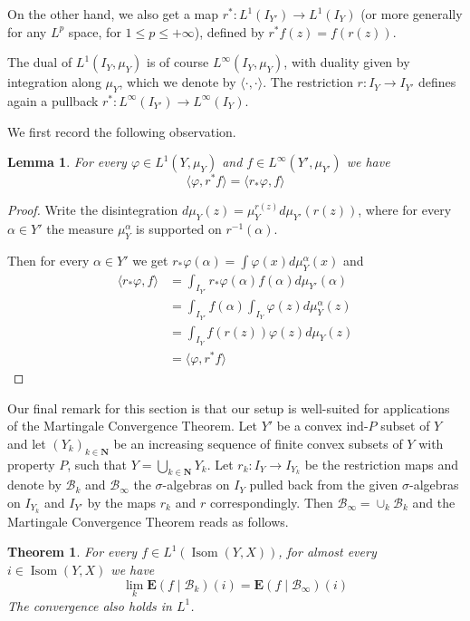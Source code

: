 \documentclass[a4paper, 11pt]{article}
\theoremstyle{plain}
\newtheorem{theorem}[proposition]{Theorem}
\newtheorem{lemma}[proposition]{Lemma}
\theoremstyle{definition}
\theoremstyle{remark}
\DeclareMathOperator{\Isom}{Isom}
\newcommand{\NN}{\mathbf{N}}                          %
\newcommand{\calB}{\mathcal{B}}
\newcommand{\EE}{\mathbf E}
\begin{document}
On the other hand, we also get a map $r^*:L^1(I_{Y'})\to L^1(I_Y)$ (or more generally for any $L^p$ space, for $1\leq p \leq +\infty$), defined by $r^* f(z) = f(r(z))$. 



The dual of $L^1(I_Y,\mu_Y)$ is of course $L^\infty(I_Y,\mu_Y)$, with duality given by integration along $\mu_Y$, which we denote by $\langle\cdot, \cdot\rangle$. The restriction $r:I_Y\to I_{Y'}$ defines again a pullback $r^*:L^\infty(I_{Y'})\to L^\infty(I_Y)$. 

We first record the following  observation.

\begin{lemma}\label{lem:duality}
For every $\varphi\in L^1(Y,\mu_Y)$ and $f\in L^\infty(Y',\mu_{Y'})$ we have
$$\langle \varphi,r^* f \rangle = \langle r_*\varphi,f \rangle$$
\end{lemma}

\begin{proof}
Write the disintegration $d\mu_Y(z)=\mu_Y^{r(z)}d\mu_{Y'}(r(z))$, where for every $\alpha\in Y'$ the measure $\mu_Y^\alpha$ is supported on $r^{-1}(\alpha)$.

Then for every $\alpha\in Y'$ we get $r_*\varphi(\alpha)=\int \varphi(x) d\mu_{Y}^\alpha(x)$ and 
\begin{align*}
\langle r_*\varphi,f \rangle &= \int_{I_{Y'}}r_*\varphi(\alpha) f(\alpha) d\mu_{Y'}(\alpha)\\
&= \int_{I_{Y'}} f(\alpha)\int_{I_Y} \varphi(z) d\mu_Y^\alpha(z) \\
&=\int_{I_Y} f(r(z)) \varphi(z) d\mu_Y(z)\\
&= \langle \varphi,r^*f \rangle
\end{align*}

\end{proof}

Our final remark for this section is that our setup is well-suited for applications of the Martingale Convergence Theorem. 
Let $Y'$ be a convex ind-$P$ subset of $Y$ and let $(Y_k)_{k\in\NN}$ be an increasing sequence of finite convex subsets of $Y$ with property $P$, such that $Y=\bigcup_{k\in \NN} Y_k$.  
Let $r_k:I_Y\to I_{Y_k}$ be the restriction maps and denote by $\calB_k$ and $\calB_\infty$ the $\sigma$-algebras on $I_Y$ pulled back from the given $\sigma$-algebras on $I_{Y_k}$ and $I_{Y'}$ by the maps $r_k$ and $r$ correspondingly.
Then $\calB_\infty=\cup_k \calB_k$ and the Martingale Convergence Theorem reads as follows.

\begin{theorem}\label{thm:martingales}
 For every $f\in L^1(\Isom(Y,X))$, for almost every $i\in\Isom(Y,X)$ we have
 $$\lim_k \EE (f\mid \calB_k)(i) = \EE(f\mid \calB_\infty)(i)$$
    The convergence also holds in $L^1$.
\end{theorem}
\end{document}
